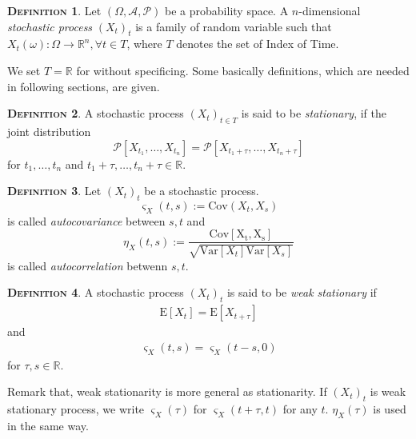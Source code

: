 \documentclass[a4paper, twoside, 11pt]{article}
\theoremstyle{definition}
\newtheorem{definition}{\scshape Definition}[section]
\newcommand{\sqbr}[1]{\left[ {#1} \right]}
\newcommand{\brkt}[1]{\left({#1} \right)}
\begin{document}
\begin{definition}
  Let $\brkt{\Omega, \mathscr{A}, \mathcal{P}}$ be a probability space. A $n$-dimensional \emph{stochastic process} $\brkt{X_t}_{t}$ is a family of random variable such that $X_t\brkt{\omega} : \Omega \longrightarrow  \mathbb{R}^{n},  \forall t \in T$, where $T$ denotes the set of Index of Time.    
\end{definition}

We set $T=\mathbb{R}$ for without specificing. Some basically definitions, which are needed in following sections, are given.
\begin{definition}
  A stochastic process $\brkt{X_t}_{t \in T}$ is said to be \emph{stationary}, if the joint distribution 
\[
  \mathcal{P}\sqbr{X_{t_1},\dots,X_{t_n}} = \mathcal{P}\sqbr{X_{t_1+\tau},\dots,X_{t_n+\tau}} 
\]
for $t_1, \dots, t_n$ and $t_1+\tau,\dots,t_n+\tau \in \mathbb{R}$. 
\label{sec:stn}
\end{definition}
\begin{definition}
  Let $(X_t)_t$ be a stochastic process. 
  \begin{equation*}
	\varsigma_X(t,s) := \mathrm{Cov}(X_t, X_s) 
  \end{equation*} is called \emph{autocovariance} between $s, t$ and 
  \begin{equation*}
	\eta_X(t, s) := \frac{\mathrm{Cov[X_t, X_s]}}{\sqrt{\mathrm{Var}[X_t]\mathrm{Var}[X_s]}}
  \end{equation*}
  is called \emph{autocorrelation} betwenn $s, t$.
\end{definition}

\begin{definition}
  A stochastic process $(X_t)_t$ is said to be \emph{weak  stationary} if 
  \begin{eqnarray*}
	\mathrm{E}[X_t] = \mathrm{E}[X_{t+\tau}]
  \end{eqnarray*}
  and 
  \begin{eqnarray*}
	\varsigma_{X}(t, s) = \varsigma_{X}(t-s, 0)
  \end{eqnarray*}
  for $\tau, s \in \mathbb{R}$.
\end{definition}
Remark that, weak stationarity is more general as stationarity. If $(X_t)_t$ is weak stationary process, we write $\varsigma_X(\tau)$ for $\varsigma_X(t+\tau, t)$ for any $t$. $\eta_X(\tau)$ is used in the same way. 

\end{document}
